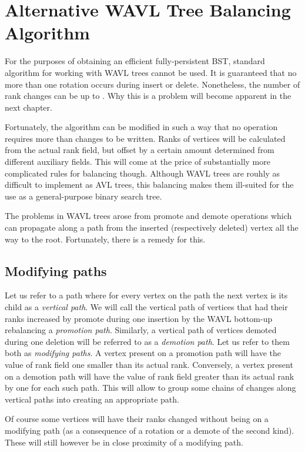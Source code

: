 \chapter{Alternative WAVL Tree Balancing Algorithm}

For the purposes of obtaining an efficient fully-persistent BST, standard algorithm for working with WAVL trees cannot be used. 
It is guaranteed that no more than one rotation occurs during insert or delete. 
Nonetheless, the number of rank changes can be up to . 
Why this is a problem will become apparent in the next chapter.

Fortunately, the algorithm can be modified in such a way that no operation requires more than  changes to be written. 
Ranks of vertices will be calculated from the actual rank field, but offset by a certain amount determined from different auxiliary fields. 
This will come at the price of substantially more complicated rules for balancing though. 
Although WAVL trees are rouhly as difficult to implement as AVL trees, this balancing makes them ill-suited for the use as a general-purpose binary search tree. 

The problems in WAVL trees arose from promote and demote operations which can propagate along a path from the inserted (respectively deleted) vertex all the way to the root. 
Fortunately, there is a remedy for this. 

\section{Modifying paths}

Let us refer to a path where for every vertex on the path the next vertex is its child as a {\em vertical path}.
We will call the vertical path of vertices that had their ranks increased by promote during one insertion by the WAVL bottom-up rebalancing a {\em promotion path}. 
Similarly, a vertical path of vertices demoted during one deletion will be referred to as a {\em demotion path}.
Let us refer to them both as {\em modifying paths}.
A vertex present on a promotion path will have the value of rank field one smaller than its actual rank. 
Conversely, a vertex present on a demotion path will have the value of rank field greater than its actual rank by one for each such path. 
This will allow to group some chains of changes along vertical paths into creating an appropriate path.

Of course some vertices will have their ranks changed without being on a modifying path (as a consequence of a rotation or a demote of the second kind). 
These will still however be in close proximity of a modifying path.

